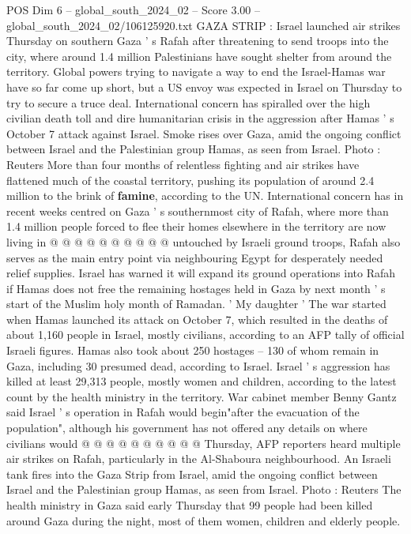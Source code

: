 \begin{textsample}{POS Dim 6 – global\_south\_2024\_02 – Score 3.00 – global\_south\_2024\_02/106125920.txt}  \label{ex:f6_pos_169}
GAZA STRIP : Israel launched air strikes Thursday on southern Gaza ' s Rafah after threatening to send troops into the city, where around 1.4 million Palestinians have sought shelter from around the territory.
Global powers trying to navigate a way to end the Israel-Hamas war have so far come up short, but a US envoy was expected in Israel on Thursday to try to secure a truce deal.
International concern has spiralled over the high civilian death toll and dire humanitarian crisis in the aggression after Hamas ' s October 7 attack against Israel.
Smoke rises over Gaza, amid the ongoing conflict between Israel and the Palestinian group Hamas, as seen from Israel.
Photo : Reuters More than four months of relentless fighting and air strikes have flattened much of the coastal territory, pushing its population of around 2.4 million to the brink of \textbf{famine}, according to the UN.
International concern has in recent weeks centred on Gaza ' s southernmost city of Rafah, where more than 1.4 million people forced to flee their homes elsewhere in the territory are now living in @ @ @ @ @ @ @ @ @ @ untouched by Israeli ground troops, Rafah also serves as the main entry point via neighbouring Egypt for desperately needed relief supplies.
Israel has warned it will expand its ground operations into Rafah if Hamas does not free the remaining hostages held in Gaza by next month ' s start of the Muslim holy month of Ramadan. ' My daughter ' The war started when Hamas launched its attack on October 7, which resulted in the deaths of about 1,160 people in Israel, mostly civilians, according to an AFP tally of official Israeli figures.
Hamas also took about 250 hostages -- 130 of whom remain in Gaza, including 30 presumed dead, according to Israel.
Israel ' s aggression has killed at least 29,313 people, mostly women and children, according to the latest count by the health ministry in the territory.
War cabinet member Benny Gantz said Israel ' s operation in Rafah would begin"after the evacuation of the population", although his government has not offered any details on where civilians would @ @ @ @ @ @ @ @ @ @ Thursday, AFP reporters heard multiple air strikes on Rafah, particularly in the Al-Shaboura neighbourhood.
An Israeli tank fires into the Gaza Strip from Israel, amid the ongoing conflict between Israel and the Palestinian group Hamas, as seen from Israel.
Photo : Reuters The health ministry in Gaza said early Thursday that 99 people had been killed around Gaza during the night, most of them women, children and elderly people.

\end{textsample}
